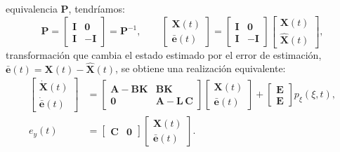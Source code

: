 equivalencia $\mathbf{P}$, tendríamos:
\begin{equation}
\mathbf{P} = \begin{bmatrix} \mathbf{I} & \mathbf{0} \\ \mathbf{I} & -\mathbf{I} \end{bmatrix} = \mathbf{P}^{-1},
\qquad
\begin{bmatrix} \mathbf{X}(t) \\ \bar{\mathbf{e}}(t) \end{bmatrix}
=
\begin{bmatrix} \mathbf{I} & \mathbf{0} \\ \mathbf{I} & -\mathbf{I} \end{bmatrix}
\begin{bmatrix} \mathbf{X}(t) \\ \widehat{\mathbf{X}}(t) \end{bmatrix},
\end{equation}
transformación que cambia el estado estimado por el error de estimación,
$\bar{\mathbf{e}}(t) = \mathbf{X}(t) - \widehat{\mathbf{X}}(t)$, se obtiene una
realización equivalente:
\begin{equation}
\begin{aligned}
\begin{bmatrix} \dot{\mathbf{X}}(t) \\ \dot{\bar{\mathbf{e}}}(t) \end{bmatrix}
&=
\begin{bmatrix} \mathbf{A} - \mathbf{B}\mathbf{K} & \mathbf{B}\mathbf{K} \\ \mathbf{0} & \mathbf{A} - \mathbf{L}\,\mathbf{C} \end{bmatrix}
\begin{bmatrix} \mathbf{X}(t) \\ \bar{\mathbf{e}}(t) \end{bmatrix}
+
\begin{bmatrix} \mathbf{E} \\ \mathbf{E} \end{bmatrix} p_{\xi}(\xi,t), \\
e_y(t) &= \begin{bmatrix} \mathbf{C} & \mathbf{0} \end{bmatrix}
\begin{bmatrix} \mathbf{X}(t) \\ \bar{\mathbf{e}}(t) \end{bmatrix}.
\end{aligned}
\label{eq:separacion}
\end{equation}
